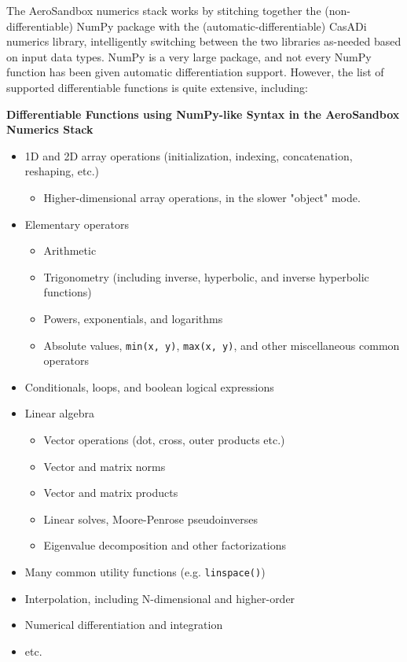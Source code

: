 The AeroSandbox numerics stack works by stitching together the (non-differentiable) NumPy package with the (automatic-differentiable) CasADi numerics library, intelligently switching between the two libraries as-needed based on input data types. NumPy is a very large package, and not every NumPy function has been given automatic differentiation support. However, the list of supported differentiable functions is quite extensive, including:

\begin{example}
    \noindent
    \textbf{Differentiable Functions using NumPy-like Syntax in the AeroSandbox Numerics Stack}

    \begin{itemize}[noitemsep]
        \item 1D and 2D array operations (initialization, indexing, concatenation, reshaping, etc.)
        \begin{itemize}[noitemsep]
            \item Higher-dimensional array operations, in the slower "object" mode.
        \end{itemize}
        \item Elementary operators
        \begin{itemize}[noitemsep]
            \item Arithmetic
            \item Trigonometry (including inverse, hyperbolic, and inverse hyperbolic functions)
            \item Powers, exponentials, and logarithms
            \item Absolute values, \texttt{min(x, y)}, \texttt{max(x, y)}, and other miscellaneous common operators
        \end{itemize}
        \item Conditionals, loops, and boolean logical expressions
        \item Linear algebra
        \begin{itemize}[noitemsep]
            \item Vector operations (dot, cross, outer products etc.)
            \item Vector and matrix norms
            \item Vector and matrix products
            \item Linear solves, Moore-Penrose pseudoinverses
            \item Eigenvalue decomposition and other factorizations
        \end{itemize}
        \item Many common utility functions (e.g. \texttt{linspace()})
        \item Interpolation, including N-dimensional and higher-order
        \item Numerical differentiation and integration
        \item etc.
    \end{itemize}


\end{example}
